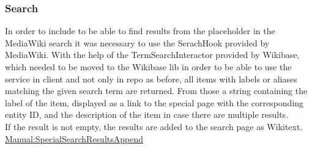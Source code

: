 \subsubsection{Search}
In order to include to be able to find results from the placeholder in the MediaWiki search it was necessary to use the SerachHook provided by MediaWiki.
With the help of the TermSearchInteractor provided by Wikibase, which needed to be moved to the Wikibase lib in order to be able to use the service in client and not only in repo as before, all items with labels or aliases matching the given search term are returned. From those a string containing the label of the item, displayed as a link to the special page with the corresponding entity ID, and the description of the item in case there are multiple results.  \\
If the result is not empty, the results are added to the search page as Wikitext. \\
\href{https://www.mediawiki.org/wiki/Manual:Hooks/SpecialSearchResultsAppend}{Manual:SpecialSearchResultsAppend}